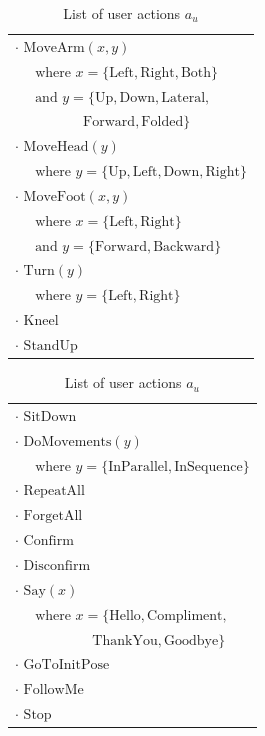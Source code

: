 \renewcommand{\arraystretch}{1.3}

\begin{table}[h]
\begin{footnotesize}
\begin{tabular}{p{60mm}} 
$\cdot$ $\mathrm{MoveArm}(x,y) $ \\ $ \ \ \ \ \ \text{ where } x=\{\mathrm{Left,Right,Both}\} $ \\ $ \ \ \ \ \  \text{ and } y = \{\mathrm{Up,Down,Lateral,}$ \\ $\ \ \ \ \ \ \ \ \ \  \ \ \ \ \ \ \ \ \ \ \ \ \mathrm{Forward,Folded}\}$ \\
$\cdot$ $\mathrm{MoveHead}(y) $ \\ $\ \ \ \ \  \text{ where } y = \{\mathrm{Up,Left,Down,Right}\}$ \\
$\cdot$ $\mathrm{MoveFoot}(x,y) $ \\ $\ \ \ \ \  \text{ where } x = \{\mathrm{Left,Right}\} $ \\ $\ \ \ \ \ \text{ and } y = \{\mathrm{Forward,Backward}\}$ \\
$\cdot$ $\mathrm{Turn}(y) $ \\ $\ \ \ \ \ \text{ where } y = \{\mathrm{Left,Right}\}$ \\ 
$\cdot$ $\mathrm{Kneel}$ \\
$\cdot$ $\mathrm{StandUp}$ 
\end{tabular}
\hspace{2cm}
\begin{tabular}{p{60mm}} 
$\cdot$ $\mathrm{SitDown}$ \\
$\cdot$ $\mathrm{DoMovements}(y) $ \\ $ \ \ \ \ \  \text{ where } y = \{\mathrm{InParallel,InSequence}\}$\\
$\cdot$ $\mathrm{RepeatAll}$ \\
$\cdot$ $\mathrm{ForgetAll}$ \\
$\cdot$ $\mathrm{Confirm}$ \\
$\cdot$ $\mathrm{Disconfirm}$ \\
$\cdot$ $\mathrm{Say}(x)$ \\  $ \ \ \ \ \  \text{ where } x = \{\mathrm{Hello, Compliment,}$ \\ $\ \ \ \ \ \ \ \ \ \ \ \ \ \ \ \ \ \ \ \ \ \ \ \ \  \mathrm{ThankYou, Goodbye}\}$\\
$\cdot$ $\mathrm{GoToInitPose}$ \\ 
$\cdot$ $\mathrm{FollowMe}$ \\
$\cdot$ $\mathrm{Stop}$ 
\end{tabular}
\end{footnotesize}
 \caption{List of user actions $a_u$} 
\label{table:userdas}
\end{table}

